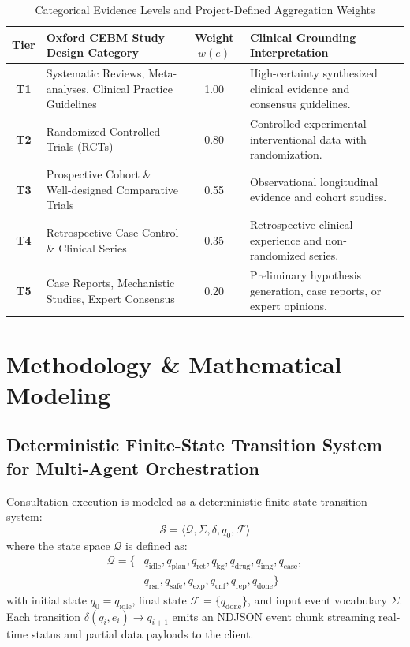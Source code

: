 \documentclass[journal,10pt,twocolumn]{IEEEtran}
\begin{document}
\begin{table}[!t]
\centering
\caption{Categorical Evidence Levels and Project-Defined Aggregation Weights}
\label{tab:cebm_weights}
\small
\begin{tabularx}{\textwidth}{clcX}
\toprule
\textbf{Tier} & \textbf{Oxford CEBM Study Design Category} & \textbf{Weight $w(e)$} & \textbf{Clinical Grounding Interpretation} \\
\midrule
\textbf{T1} & Systematic Reviews, Meta-analyses, Clinical Practice Guidelines & 1.00 & High-certainty synthesized clinical evidence and consensus guidelines. \\
\textbf{T2} & Randomized Controlled Trials (RCTs) & 0.80 & Controlled experimental interventional data with randomization. \\
\textbf{T3} & Prospective Cohort \& Well-designed Comparative Trials & 0.55 & Observational longitudinal evidence and cohort studies. \\
\textbf{T4} & Retrospective Case-Control \& Clinical Series & 0.35 & Retrospective clinical experience and non-randomized series. \\
\textbf{T5} & Case Reports, Mechanistic Studies, Expert Consensus & 0.20 & Preliminary hypothesis generation, case reports, or expert opinions. \\
\bottomrule
\end{tabularx}
\end{table}

\section{Methodology \& Mathematical Modeling}

\subsection{Deterministic Finite-State Transition System for Multi-Agent Orchestration}
Consultation execution is modeled as a deterministic finite-state transition system:
\begin{equation}
\mathcal{S} = \langle \mathcal{Q}, \Sigma, \delta, q_0, \mathcal{F} \rangle
\end{equation}
where the state space $\mathcal{Q}$ is defined as:
\begin{equation}
\begin{aligned}
\mathcal{Q} = \{& q_{\text{idle}}, q_{\text{plan}}, q_{\text{ret}}, q_{\text{kg}}, q_{\text{drug}}, q_{\text{img}}, q_{\text{case}}, \\
                & q_{\text{rsn}}, q_{\text{safe}}, q_{\text{exp}}, q_{\text{cnf}}, q_{\text{rep}}, q_{\text{done}} \}
\end{aligned}
\end{equation}
with initial state $q_0 = q_{\text{idle}}$, final state $\mathcal{F} = \{q_{\text{done}}\}$, and input event vocabulary $\Sigma$. Each transition $\delta(q_i, e_i) \to q_{i+1}$ emits an NDJSON event chunk streaming real-time status and partial data payloads to the client.
\end{document}
